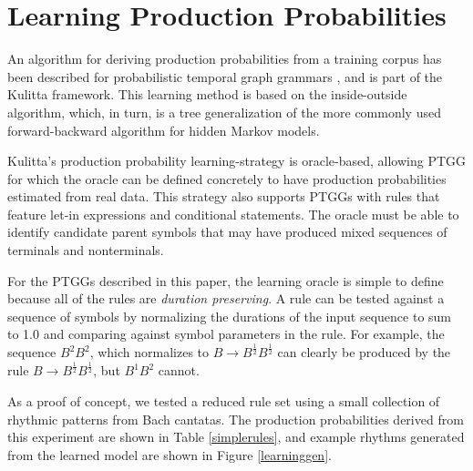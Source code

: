 \documentclass{article}
\begin{document}
\section{Learning Production Probabilities}

An algorithm for deriving production probabilities from a training corpus has been described for probabilistic temporal graph grammars \cite{kulitta_learning}, and is part of the Kulitta framework. This learning method is based on the inside-outside algorithm\cite{lari1990}, which, in turn, is a tree generalization of the more commonly used forward-backward algorithm for hidden Markov models.

Kulitta's production probability learning-strategy is \linebreak oracle-based, allowing PTGG for which the oracle can be defined concretely to have production probabilities estimated from real data. This strategy also supports PTGGs with rules that feature let-in expressions and conditional statements. The oracle must be able to identify candidate parent symbols that may have produced mixed sequences of terminals and nonterminals. 

For the PTGGs described in this paper, the learning oracle is simple to define because all of the rules are \emph{duration preserving}. A rule can be tested against a sequence of symbols by normalizing the durations of the input sequence to sum to 1.0 and comparing against symbol parameters in the rule. For example, the sequence $B^{2}B^{2}$, which normalizes to $B \rightarrow B^\frac{1}{2} B^\frac{1}{2}$ can clearly be produced by the rule $B \rightarrow B^\frac{1}{2} B^\frac{1}{2}$, but $B^{1} B^{2}$ cannot. 

As a proof of concept, we tested a reduced rule set using a small collection of rhythmic patterns from Bach cantatas. The production probabilities derived from this experiment are shown in Table \ref{simplerules}, and example rhythms generated from the learned model are shown in Figure \ref{learninggen}.
\end{document}

